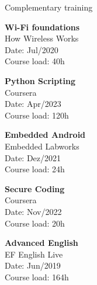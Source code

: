 \documentclass[
	11pt, %
]{resume} %
\begin{document}
\begin{rSection}{Complementary training}
	\begin{multicols}{5}
    	{\bf Wi-Fi foundations} 
		\\How Wireless Works
		\\Date: Jul/2020
		\\Course load: 40h
		
		{\bf Python Scripting}
		\\Coursera
		\\Date: Apr/2023
		\\Course load: 120h
		
		{\bf Embedded Android}
		\\Embedded Labworks
		\\Date: Dez/2021
		\\Course load: 24h
		
		{\bf Secure Coding}
		\\Coursera
		\\Date: Nov/2022
		\\Course load: 20h
		
		{\bf Advanced English}
		\\EF English Live
		\\Date: Jun/2019
		\\Course load: 164h
	\end{multicols}
\end{rSection}

\iffalse
\begin{rSection}{Technical Strengths}
	
	\begin{multicols}{3}
		\begin{itemize}
			\item Software version control
			\item Issue debug and bug fix
			\item Scrum agile methodology
			\item Technical documentation
			\item Secure coding
			
			\item Wireless technologies
			\item Positioning systems
			\item Mobile devices
			\item Android OS architecture
			\item Python and shell scripting
			
			\item Remote tools
			\item Jira
			\item Jenkins
			\item Build systems
			\item Bench instruments
		
		\end{itemize}
	\end{multicols}

\end{rSection}
\fi
\end{document}
